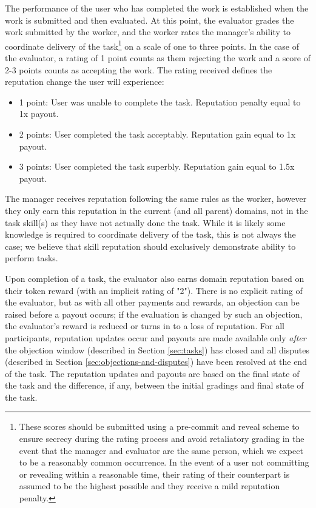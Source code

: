 The performance of the user who has completed the work is established when the work is submitted and then evaluated. At this point, the evaluator grades the work submitted by the worker, and the worker rates the manager's ability to coordinate delivery of the task\footnote{These scores should be submitted using a pre-commit and reveal scheme to ensure secrecy during the rating process and avoid retaliatory grading in the event that the manager and evaluator are the same person, which we expect to be a reasonably common occurrence. In the event of a user not committing or revealing within a reasonable time, their rating of their counterpart is assumed to be the highest possible and they receive a mild reputation penalty. } on a scale of one to three points. In the case of the evaluator, a rating of 1 point counts as them rejecting the work and a score of 2-3 points counts as accepting the work. The rating received defines the reputation change the user will experience:

\begin{itemize}
 \item[]1 point:\phantom{s} User was unable to complete the task. Reputation penalty equal to 1x payout.
 \item[]2 points: User completed the task acceptably. Reputation gain equal to 1x payout.
 \item[]3 points: User completed the task superbly. Reputation gain equal to 1.5x payout.
\end{itemize}

The manager receives reputation following the same rules as the worker, however they only earn this reputation in the current (and all parent) domains, not in the task skill(s) as they have not actually done the task. While it is likely some knowledge is required to coordinate delivery of the task, this is not always the case; we believe that skill reputation should exclusively demonstrate ability to perform tasks.

Upon completion of a task, the evaluator also earns domain reputation based on their token reward (with an implicit rating of "2"). There is no explicit rating of the evaluator, but as with all other payments and rewards, an objection can be raised before a payout occurs; if the evaluation is changed by such an objection, the evaluator's reward is reduced or turns in to a loss of reputation. For all participants, reputation updates occur and payouts are made available only \emph{after} the objection window (described in Section \ref{sec:tasks}) has closed and all disputes  (described in Section \ref{sec:objections-and-disputes}) have been resolved at the end of the task. The reputation updates and payouts are based on the final state of the task and the difference, if any, between the initial gradings and final state of the task.

